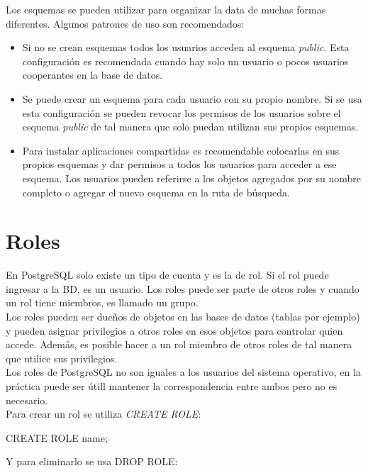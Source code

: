 Los esquemas se pueden utilizar para organizar la data de muchas formas diferentes. Algunos patrones de uso son recomendados:

\begin{itemize}
\item Si no se crean esquemas todos los usuarios acceden al esquema \textit{public}. Esta configuración es recomendada cuando hay solo un usuario o pocos usuarios cooperantes en la base de datos.
\item Se puede crear un esquema para cada usuario con su propio nombre. Si se usa esta configuración se pueden revocar los permisos de los usuarios sobre el esquema \textit{public} de tal manera que solo puedan utilizan sus propios esquemas.
\item Para instalar aplicaciones compartidas es recomendable colocarlas en sus propios esquemas y dar permisos a todos los usuarios para acceder a ese esquema. Los usuarios pueden referirse a los objetos agregados por su nombre completo o agregar el nuevo esquema en la ruta de búsqueda.
\end{itemize}

\section{Roles}

En PostgreSQL solo existe un tipo de cuenta y es la de rol. Si el rol puede ingresar a la BD, es un usuario. Los roles puede ser parte de otros roles y cuando un rol tiene miembros, es llamado un grupo. \\

Los roles pueden ser dueños de objetos en las bases de datos (tablas por ejemplo) y pueden asignar privilegios a otros roles en esos objetos para controlar quien accede. Además, es posible hacer a un rol miembro de otros roles de tal manera que utilice sus privilegios.\\

Los roles de PostgreSQL no son iguales a los usuarios del sistema operativo, en la práctica puede ser útill mantener la correspondencia entre ambos pero no es necesario.\\

Para crear un rol se utiliza \textit{CREATE ROLE}:\\

\begin{pyglist}
CREATE ROLE name;
\end{pyglist}

Y para eliminarlo se usa DROP ROLE:\\

